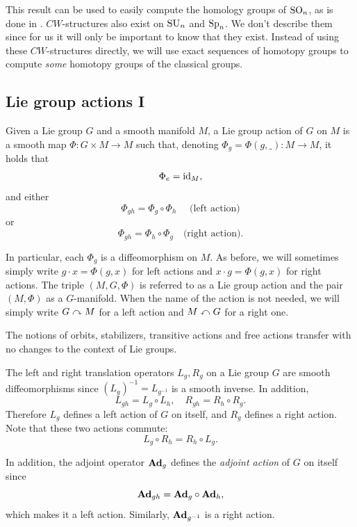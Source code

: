 This result can be used to easily compute the homology groups of $\operatorname{SO}_n$, as is done in \cite{Hatcher}. $CW$-structures also exist on $\operatorname{SU}_n$ and $\operatorname{Sp}_n$. We don't describe them since for us it will only be important to know that they exist. Instead of using these $CW$-structures directly, we will use exact sequences of homotopy groups to compute \emph{some} homotopy groups of the classical groups.





\subsection{Lie group actions I} \label{sec: Lie group actions}

\begin{defn}
    Given a Lie group $G$ and a smooth manifold $M$, a Lie group action of $G$ on $M$ is a smooth map $\Phi:G\times M\to M$ such that, denoting $\Phi_g=\Phi(g,\_):M\to M$, it holds that \[\Phi_e=\operatorname{id}_M,\] and either
    \[\Phi_{gh}=\Phi_g\circ \Phi_h\quad  \text{    (left action)}\]
    or
    \[\Phi_{gh}=\Phi_h\circ \Phi_g\quad  \text{(right action)}.\]

    In particular, each $\Phi_g$ is a diffeomorphism on $M$. As before, we will sometimes simply write $g\cdot x=\Phi(g,x)$ for left actions and $x\cdot g=\Phi(g,x)$ for right actions. The triple $(M,G,\Phi)$ is referred to as a Lie group action and the pair $(M,\Phi)$ as a $G$-manifold. When the name of the action is not needed, we will simply write $G\curvearrowright M$ for a left action and $M\curvearrowleft G$ for a right one.
\end{defn}

The notions of orbits, stabilizers, transitive actions and free actions transfer with no changes to the context of Lie groups.

\begin{example}
    The left and right translation operators $L_g,R_g$ on a Lie group $G$ are smooth diffeomorphisms since $(L_g)^{-1}=L_{g^{-1}}$ is a smooth inverse. In addition,
    \[L_{gh}=L_g\circ L_h,\quad R_{gh}=R_h\circ R_g.\]
    Therefore $L_g$ defines a left action of $G$ on itself, and $R_g$ defines a right action. Note that these two actions commute: 
    \[L_g\circ R_h=R_h\circ L_g.\]
    
    In addition, the adjoint operator $\mathrm{\mathbf{Ad}}_g$ defines the \emph{adjoint action} of $G$ on itself since 
    \[\mathrm{\mathbf{Ad}}_{gh}=\mathrm{\mathbf{Ad}}_g\circ \mathrm{\mathbf{Ad}}_h,\]
    which makes it a left action. Similarly, $\mathrm{\mathbf{Ad}}_{g^{-1}}$ is a right action.
\end{example}

